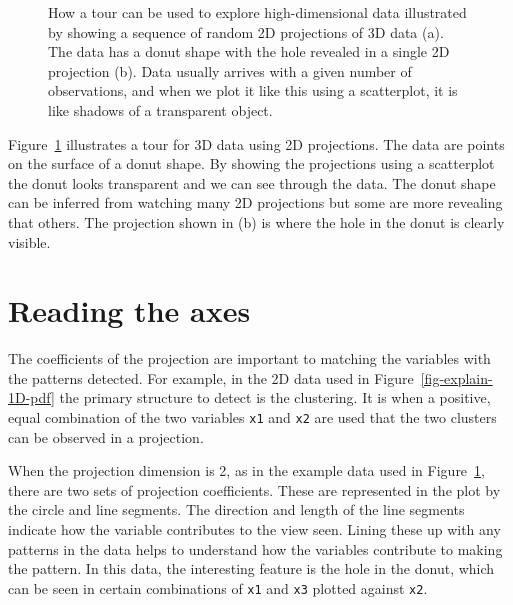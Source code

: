 \documentclass[
  letterpaper,
]{krantz}
\begin{document}
\begin{figure}


\caption{\label{fig-explain-2D-pdf}How a tour can be used to explore
high-dimensional data illustrated by showing a sequence of random 2D
projections of 3D data (a). The data has a donut shape with the hole
revealed in a single 2D projection (b). Data usually arrives with a
given number of observations, and when we plot it like this using a
scatterplot, it is like shadows of a transparent object.
}

\end{figure}%

Figure~\ref{fig-explain-2D-pdf} illustrates a tour for 3D data using 2D
projections. The data are points on the surface of a donut shape. By
showing the projections using a scatterplot the donut looks transparent
and we can see through the data. The donut shape can be inferred from
watching many 2D projections but some are more revealing that others.
The projection shown in (b) is where the hole in the donut is clearly
visible. 

\section{Reading the axes}\label{reading-the-axes}

The coefficients of the projection are important to matching the
variables with the patterns detected. For example, in the 2D data used
in Figure~\ref{fig-explain-1D-pdf} the primary structure to detect is
the clustering. It is when a positive, equal combination of the two
variables \texttt{x1} and \texttt{x2} are used that the two clusters can
be observed in a projection.

When the projection dimension is 2, as in the example data used in
Figure~\ref{fig-explain-2D-pdf}, there are two sets of projection
coefficients. These are represented in the plot by the circle and line
segments. The direction and length of the line segments indicate how the
variable contributes to the view seen. Lining these up with any patterns
in the data helps to understand how the variables contribute to making
the pattern. In this data, the interesting feature is the hole in the
donut, which can be seen in certain combinations of \texttt{x1} and
\texttt{x3} plotted against \texttt{x2}.
\end{document}
